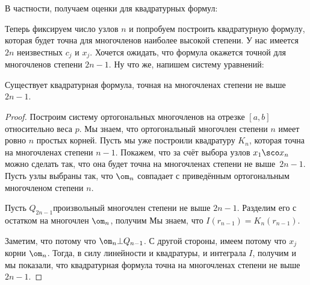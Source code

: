 \documentclass[a4paper]{article}
\newcommand{\dx}{\,dx}
\begin{document}
В частности, получаем оценки для квадратурных формул:

Теперь фиксируем число узлов $n$ и попробуем построить квадратурную формулу, которая будет точна для многочленов наиболее
высокой степени. У нас имеется $2n$ неизвестных $c_j$ и $x_j$.
Хочется ожидать, что формула окажется точной для многочленов степени $2n-1$.
Ну что же, напишем систему уравнений:

\begin{stm}
Существует квадратурная формула, точная на многочленах степени не выше $2n-1$.
\end{stm}
\begin{proof}
Построим систему ортогональных многочленов на отрезке $[a,b]$ относительно веса $p$.
Мы знаем, что ортогональный многочлен степени $n$ имеет ровно $n$ простых корней.
Пусть мы уже построили квадратуру $K_n$, которая точна на многочленах степени $n-1$.
Покажем, что за счёт выбора узлов $x_1\sco x_n$ можно сделать так,
что она будет точна на многочленах степени не выше~${2n-1}$.
Пусть узлы выбраны так, что $\om_n$ совпадает с приведённым ортогональным многочленом степени $n$.

Пусть $Q_{2n-1}$\т произвольный многочлен степени не выше $2n-1$.
Разделим его с остатком на многочлен $\om_n$, получим
Мы знаем, что $I(r_{n-1}) = K_n(r_{n-1})$.

Заметим, что
\eqn{I(Q_{n-1}\om_n) = \int p(x) Q_{n-1}(x)\om_n(x)\dx = 0,}
потому что $\om_n \bot Q_{n-1}$.
С другой стороны, имеем
потому что $x_j$\т корни $\om_n$. Тогда, в силу линейности и квадратуры, и интеграла $I$, получим
и мы показали, что квадратурная формула точна на многочленах степени не выше $2n-1$.
\end{proof}
\end{document}
